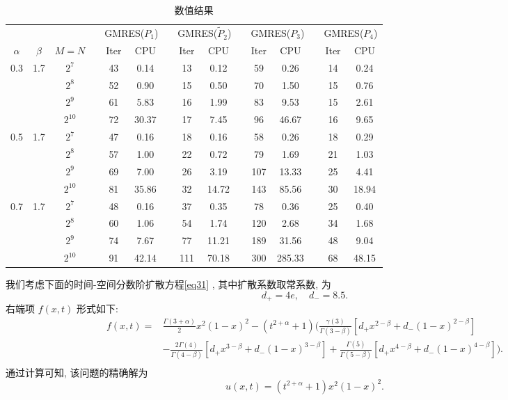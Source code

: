 \documentclass{ecnumaster}
\begin{document}
\begin{table}[H]
\centering
\caption{数值结果} \label{tab4-4-3}\smallskip
\begin{tabular}{ccccccccccccccc} \toprule
& &  && \multicolumn{2}{c}{GMRES($P_1$)}
&& \multicolumn{2}{c}{GMRES($\tilde{P}_2$)}
&& \multicolumn{2}{c}{GMRES($P_3$)}
&& \multicolumn{2}{c}{GMRES($P_4$)} \\
$\alpha$ & $\beta$ & $M = N$ && Iter & CPU && Iter & CPU
&& Iter & CPU && Iter & CPU\\ \midrule
0.3 & 1.7
 & $2^7$     && 43 &0.14   && 13 & 0.12  && 59 & 0.26   && 14 & 0.24  \\
&& $2^8$     && 52 &0.90   && 15 & 0.50  && 70 & 1.50   && 15 & 0.76  \\
&& $2^9$     && 61 &5.83   && 16 & 1.99  && 83 & 9.53   && 15 & 2.61  \\
&& $2^{10}$  && 72 &30.37  && 17 & 7.45  && 96 & 46.67  && 16 & 9.65  \\ \midrule
0.5 & 1.7
 & $2^7$     && 47 &0.16   && 18 & 0.16  && 58 & 0.26   && 18 & 0.29  \\
&& $2^8$     && 57 &1.00   && 22 & 0.72  && 79 & 1.69   && 21 & 1.03   \\
&& $2^9$     && 69 &7.00   && 26 & 3.19  && 107 & 13.33 && 25 & 4.41   \\
&& $2^{10}$  && 81 &35.86  && 32 & 14.72 && 143 & 85.56 && 30 & 18.94  \\ \midrule
0.7 & 1.7
 & $2^7$     && 48 &0.16   && 37 & 0.35  && 78 & 0.36   && 25 & 0.40   \\
&& $2^8$     && 60 &1.06   && 54 & 1.74  && 120 & 2.68  && 34 & 1.68   \\
&& $2^9$     && 74 &7.67   && 77 & 11.21 && 189 & 31.56 && 48 & 9.04   \\
&& $2^{10}$  && 91 &42.14  && 111 & 70.18&& 300 & 285.33&& 68 & 48.15  \\ \bottomrule
\end{tabular}
\end{table}

\begin{example}\label{example-2}
我们考虑下面的时间-空间分数阶扩散方程\eqref{eq31}
, 其中扩散系数取常系数, 为
$$d_+ = 4e, \quad d_- = 8.5.$$
右端项 $f(x, t)$ 形式如下:
\begin{equation}
  \begin{split}\nonumber
    f(x, t) = &\frac{\Gamma(3 + \alpha)}{2} x^2 (1-x)^2 - (t^{2+\alpha} + 1)  ( \frac{\gamma(3)}{\Gamma(3-\beta)}[d_+ x^{2-\beta} + d_-(1-x)^{2-\beta}]\\
              &- \frac{2\Gamma(4)}{\Gamma(4-\beta)}[d_+ x^{3-\beta} + d_- (1-x)^{3-\beta}] + \frac{\Gamma(5)}{\Gamma(5-\beta)}[d_+ x^{4-\beta} + d_-(1-x)^{4-\beta}] ).\\
  \end{split}
\end{equation}
通过计算可知, 
该问题的精确解为
\begin{equation}
  u(x, t) = (t^{2+\alpha} + 1)x^2(1-x)^2.
\end{equation}
\end{example}
\end{document}
